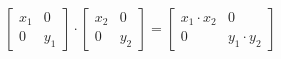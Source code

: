 \documentclass[preview]{standalone}
\begin{document}
\begin{center}
$\begin{bmatrix} x_1 & 0 \\ 0 & y_1 \end{bmatrix} \cdot \begin{bmatrix} x_2 & 0 \\ 0 & y_2 \end{bmatrix} = \begin{bmatrix} x_1 \cdot x_2 & 0 \\ 0 & y_1 \cdot y_2 \end{bmatrix}$
\end{center}
\end{document}
